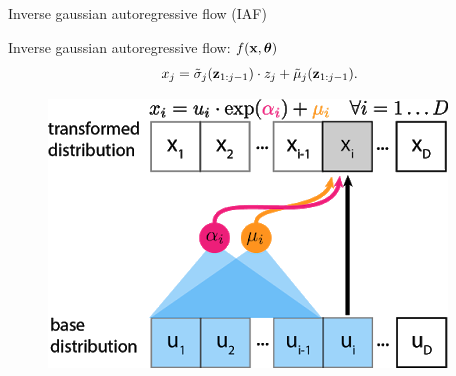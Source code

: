 \begin{frame}{Inverse gaussian autoregressive flow (IAF)}
	\begin{minipage}[t]{0.65\columnwidth}
		\begin{block}{Inverse gaussian autoregressive flow: $f(\mathbf{x}, \boldsymbol{\theta})$}
			\vspace{-0.3cm}
			\[
			x_j = \tilde{\sigma}_j (\mathbf{z}_{1:j-1}) \cdot z_j + \tilde{\mu}_j(\mathbf{z}_{1:j-1}).
			\]
		\end{block}
	\end{minipage}%
	\begin{minipage}[t]{0.35\columnwidth}
		\begin{figure}[h]
			\centering
			\includegraphics[width=.9\linewidth]{figs/af_iaf_explained_3.png}
		\end{figure}
	\end{minipage}
	
\end{frame}
